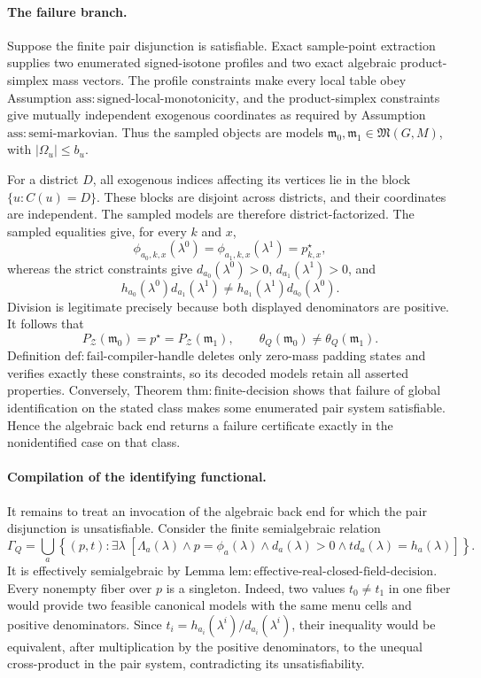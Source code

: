 \paragraph{The failure branch.}
Suppose the finite pair disjunction is satisfiable.  Exact sample-point extraction supplies two enumerated signed-isotone profiles and two exact algebraic product-simplex mass vectors.  The profile constraints make every local table obey Assumption \(\mathrm{ass:signed\text{-}local\text{-}monotonicity}\), and the product-simplex constraints give mutually independent exogenous coordinates as required by Assumption \(\mathrm{ass:semi\text{-}markovian}\).  Thus the sampled objects are models \(\mathfrak m_0,\mathfrak m_1\in\mathfrak M(G,M)\), with \(|\Omega_u|\le b_u\).

For a district \(D\), all exogenous indices affecting its vertices lie in the block \(\{u:C(u)=D\}\).  These blocks are disjoint across districts, and their coordinates are independent.  The sampled models are therefore district-factorized.  The sampled equalities give, for every \(k\) and \(x\),
\[
 \phi_{a_0,k,x}(\lambda^0)
 =\phi_{a_1,k,x}(\lambda^1)
 =p^{\star}_{k,x},
\]
whereas the strict constraints give \(d_{a_0}(\lambda^0)>0\), \(d_{a_1}(\lambda^1)>0\), and
\[
 h_{a_0}(\lambda^0)d_{a_1}(\lambda^1)
 \ne
 h_{a_1}(\lambda^1)d_{a_0}(\lambda^0).
\]
Division is legitimate precisely because both displayed denominators are positive.  It follows that
\[
 P_{\mathcal Z}(\mathfrak m_0)=p^{\star}
 =P_{\mathcal Z}(\mathfrak m_1),
 \qquad
 \theta_Q(\mathfrak m_0)\ne\theta_Q(\mathfrak m_1).
\]
Definition \(\mathrm{def:fail\text{-}compiler\text{-}handle}\) deletes only zero-mass padding states and verifies exactly these constraints, so its decoded models retain all asserted properties.  Conversely, Theorem \(\mathrm{thm:finite\text{-}decision}\) shows that failure of global identification on the stated class makes some enumerated pair system satisfiable.  Hence the algebraic back end returns a failure certificate exactly in the nonidentified case on that class.

\paragraph{Compilation of the identifying functional.}
It remains to treat an invocation of the algebraic back end for which the pair disjunction is unsatisfiable.  Consider the finite semialgebraic relation
\[
 \Gamma_Q
 =\bigcup_a\left\{(p,t):
 \exists\lambda\;\left[
 \Lambda_a(\lambda)\wedge p=\phi_a(\lambda)
 \wedge d_a(\lambda)>0
 \wedge t d_a(\lambda)=h_a(\lambda)
 \right]\right\}.
\]
It is effectively semialgebraic by Lemma \(\mathrm{lem:effective\text{-}real\text{-}closed\text{-}field\text{-}decision}\).  Every nonempty fiber over \(p\) is a singleton.  Indeed, two values \(t_0\ne t_1\) in one fiber would provide two feasible canonical models with the same menu cells and positive denominators.  Since \(t_i=h_{a_i}(\lambda^i)/d_{a_i}(\lambda^i)\), their inequality would be equivalent, after multiplication by the positive denominators, to the unequal cross-product in the pair system, contradicting its unsatisfiability.

